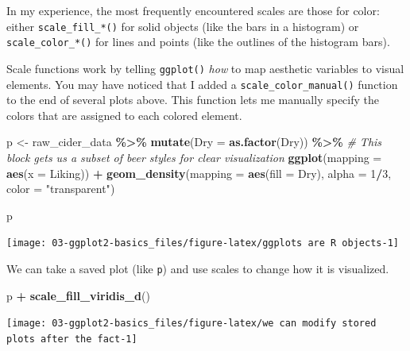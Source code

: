 \documentclass[
]{book}
\newenvironment{Shaded}{\begin{snugshade}}{\end{snugshade}}
\newcommand{\AttributeTok}[1]{\textcolor[rgb]{0.13,0.29,0.53}{#1}}
\newcommand{\CommentTok}[1]{\textcolor[rgb]{0.56,0.35,0.01}{\textit{#1}}}
\newcommand{\DecValTok}[1]{\textcolor[rgb]{0.00,0.00,0.81}{#1}}
\newcommand{\FunctionTok}[1]{\textcolor[rgb]{0.13,0.29,0.53}{\textbf{#1}}}
\newcommand{\NormalTok}[1]{#1}
\newcommand{\OtherTok}[1]{\textcolor[rgb]{0.56,0.35,0.01}{#1}}
\newcommand{\SpecialCharTok}[1]{\textcolor[rgb]{0.81,0.36,0.00}{\textbf{#1}}}
\newcommand{\StringTok}[1]{\textcolor[rgb]{0.31,0.60,0.02}{#1}}
\begin{document}
In my experience, the most frequently encountered scales are those for color: either \texttt{scale\_fill\_*()} for solid objects (like the bars in a histogram) or \texttt{scale\_color\_*()} for lines and points (like the outlines of the histogram bars).

Scale functions work by telling \texttt{ggplot()} \emph{how} to map aesthetic variables to visual elements. You may have noticed that I added a \texttt{scale\_color\_manual()} function to the end of several plots above. This function lets me manually specify the colors that are assigned to each colored element.

\begin{Shaded}
\begin{Highlighting}[]
\NormalTok{p }\OtherTok{\textless{}{-}} 
\NormalTok{  raw\_cider\_data }\SpecialCharTok{\%\textgreater{}\%}
  \FunctionTok{mutate}\NormalTok{(}\AttributeTok{Dry =} \FunctionTok{as.factor}\NormalTok{(Dry)) }\SpecialCharTok{\%\textgreater{}\%}
  \CommentTok{\# This block gets us a subset of beer styles for clear visualization}
  \FunctionTok{ggplot}\NormalTok{(}\AttributeTok{mapping =} \FunctionTok{aes}\NormalTok{(}\AttributeTok{x =}\NormalTok{ Liking)) }\SpecialCharTok{+} 
  \FunctionTok{geom\_density}\NormalTok{(}\AttributeTok{mapping =} \FunctionTok{aes}\NormalTok{(}\AttributeTok{fill =}\NormalTok{ Dry), }\AttributeTok{alpha =} \DecValTok{1}\SpecialCharTok{/}\DecValTok{3}\NormalTok{, }\AttributeTok{color =} \StringTok{"transparent"}\NormalTok{)}

\NormalTok{p}
\end{Highlighting}
\end{Shaded}

\begin{center}\texttt{[image: 03-ggplot2-basics\_files/figure-latex/ggplots are R objects-1]} \end{center}

We can take a saved plot (like \texttt{p}) and use scales to change how it is visualized.

\begin{Shaded}
\begin{Highlighting}[]
\NormalTok{p }\SpecialCharTok{+} \FunctionTok{scale\_fill\_viridis\_d}\NormalTok{()}
\end{Highlighting}
\end{Shaded}

\begin{center}\texttt{[image: 03-ggplot2-basics\_files/figure-latex/we can modify stored plots after the fact-1]} \end{center}
\end{document}
